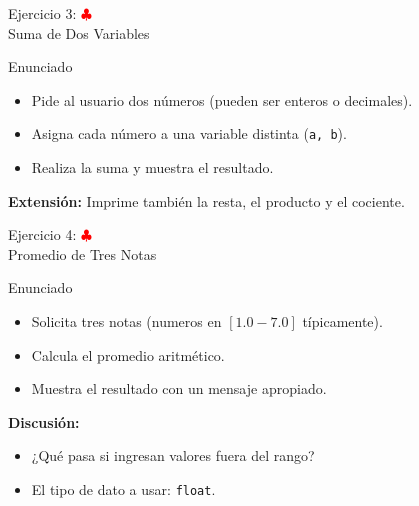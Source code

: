\documentclass[10pt]{beamer}
\begin{document}
\begin{frame}{Ejercicio 3: \hfill \textcolor{red}{$\clubsuit$} \\ Suma de Dos Variables}
  \begin{block}{Enunciado}
    \begin{itemize}
      \item Pide al usuario dos números (pueden ser enteros o decimales).
      \item Asigna cada número a una variable distinta (\texttt{a, b}).
      \item Realiza la suma y muestra el resultado.
    \end{itemize}
  \end{block}
  \textbf{Extensión:} Imprime también la resta, el producto y el cociente.
\end{frame}

\begin{frame}{Ejercicio 4: \hfill \textcolor{red}{$\clubsuit$} \\ Promedio de Tres Notas }
  \begin{block}{Enunciado}
    \begin{itemize}
      \item Solicita tres notas (numeros en \([1.0 - 7.0]\) típicamente).
      \item Calcula el promedio aritmético.
      \item Muestra el resultado con un mensaje apropiado.
    \end{itemize}
  \end{block}
  \textbf{Discusión:}
  \begin{itemize}
    \item ¿Qué pasa si ingresan valores fuera del rango?
    \item El tipo de dato a usar: \texttt{float}.
  \end{itemize}
\end{frame}
\end{document}
